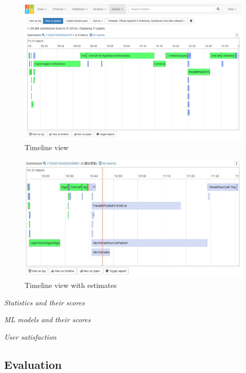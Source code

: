 \documentclass[english,12pt,a4paper,pdftex,sci,utf8]{aaltothesis}
\theoremstyle{definition}
\newcommand{\nyi}[1]{\noindent\colorbox{nyibg}{\textcolor{nyitext}{\emph{#1}}}}
\begin{document}
\begin{figure}[htb]
\centering \includegraphics[width=\linewidth]{gfx/timeline.png}
\caption{Timeline view \label{fig:timeline}}
\end{figure}

\begin{figure}[htb]
\centering \includegraphics[width=\linewidth]{gfx/estimates.jpg}
\caption{Timeline view with estimates \label{fig:estimates}}
\end{figure}

\nyi{Statistics and their scores}

\nyi{ML models and their scores}

\nyi{User satisfaction}

\subsection{Evaluation}
\label{sec:evaluation}

\end{document}
